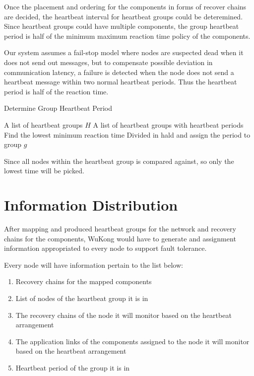 Once the placement and ordering for the components in forms of recover chains
are decided, the heartbeat interval for heartbeat groups could be deteremined.
Since heartbeat groups could have multiple components, the group heartbeat
period is half of the minimum maximum reaction time policy of the components.

Our system assumes a fail-stop model where nodes are suspected dead when it
does not send out messages, but to compensate possible deviation in
communication latency, a failure is detected when the node does not send
a heartbeat message within two normal heartbeat periods. Thus the heartbeat
period is half of the reaction time.

\begin{algorithm}
\caption{Determine Group Heartbeat Period}
\label{alg:determine-group-heartbeat-period}
\begin{algorithmic}
\Require A list of heartbeat groups $H$
\Ensure A list of heartbeat groups with heartbeat periods
    \State Find the lowest minimum reaction time
    \State Divided in hald and assign the period to group $g$
  \EndFor
\EndFor
\end{algorithmic}
\end{algorithm}

Since all nodes within the heartbeat group is compared against, so only the
lowest time will be picked.

\section{Information Distribution}

After mapping and produced heartbeat groups for the network and recovery chains
for the components, WuKong would have to generate and assignment information
appropriated to every node to support fault tolerance.

Every node will have information pertain to the list below:

\begin{enumerate}
\item Recovery chains for the mapped components
\item List of nodes of the heartbeat group it is in
\item The recovery chains of the node it will monitor based on
the heartbeat arrangement
\item The application links of the components assigned to the node it will
monitor based on the heartbeat arrangement
\item Heartbeat period of the group it is in
\end{enumerate}

